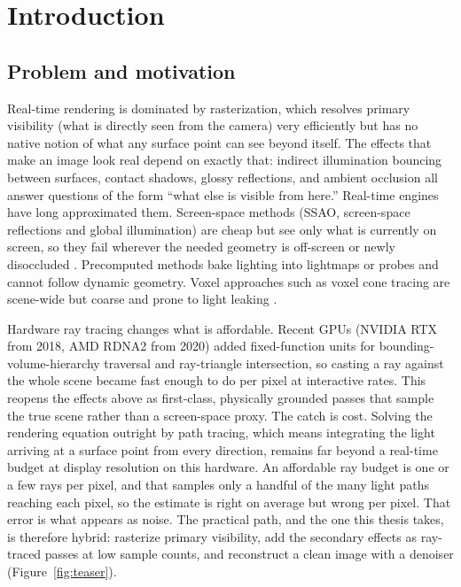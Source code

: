\chapter{Introduction}
\label{ch:uvod}


\section{Problem and motivation}

Real-time rendering is dominated by rasterization, which resolves primary visibility (what is
directly seen from the camera) very efficiently but has no native notion of what any surface point
can see beyond itself. The effects that make an image look real depend on exactly that: indirect
illumination bouncing between surfaces, contact shadows, glossy reflections, and ambient occlusion
all answer questions of the form ``what else is visible from here.'' Real-time engines have long
approximated them.
Screen-space methods (SSAO, screen-space reflections and global illumination) are cheap but see only
what is currently on screen, so they fail wherever the needed geometry is off-screen or newly
disoccluded \cite{mittring2007cryengine, bavoil2008hbao}. Precomputed methods bake lighting into
lightmaps or probes and cannot follow dynamic geometry. Voxel approaches such as voxel cone tracing
are scene-wide but coarse and prone to light leaking \cite{crassin2011vxgi}.

Hardware ray tracing changes what is affordable. Recent GPUs (NVIDIA RTX from 2018, AMD RDNA2 from
2020) added fixed-function units for bounding-volume-hierarchy traversal and ray-triangle
intersection, so casting a ray against the whole scene became fast enough to do per pixel at
interactive rates. This reopens the effects above as first-class, physically grounded passes that
sample the true scene rather than a screen-space proxy. The catch is cost. Solving the rendering
equation \cite{kajiya1986rendering} outright by path tracing, which means integrating the light
arriving at a surface point from every direction, remains far beyond a real-time budget at display
resolution on this hardware. An affordable ray budget is one or a few rays per pixel, and that
samples only a handful of the many light paths reaching each pixel, so the estimate is right on
average but wrong per pixel. That error is what appears as noise. The practical path, and the one this thesis takes, is therefore
hybrid: rasterize primary visibility, add the secondary effects as ray-traced passes at low sample
counts, and reconstruct a clean image with a denoiser \cite{schied2017svgf}
(Figure~\ref{fig:teaser}).

